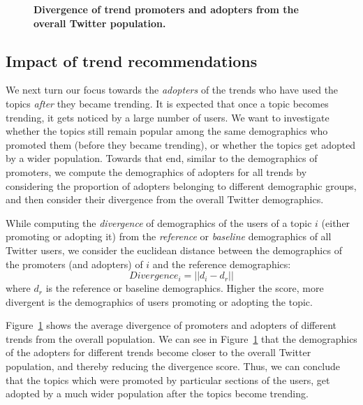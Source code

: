 \documentclass[letterpaper]{article}
\begin{document}
\begin{figure}[t]
\caption{{\bf Divergence of trend promoters and adopters from the overall Twitter population.}}
\label{fig:promoter_adopter_bias}
\vspace*{-5mm}
\end{figure}

\subsection{Impact of trend recommendations}
\noindent
We next turn our focus towards the {\it adopters} of the trends who have used the topics
{\it after} they became trending. It is expected that once a topic becomes trending,
it gets noticed by a large number of users.
We want to investigate whether the topics still remain popular among the same demographics who promoted them
(before they became trending),
or whether the topics get adopted by a wider population.
Towards that end, similar to the demographics of promoters, we compute the
demographics of adopters for all trends by considering the proportion of adopters belonging
to different demographic groups, and then consider their divergence from the overall Twitter demographics.

While computing the {\it divergence} of demographics of the users of a topic $i$ (either promoting or adopting it)
from the {\it reference} or {\it baseline} demographics of all Twitter users, we consider the euclidean distance between
the demographics of the promoters (and adopters) of $i$ and the reference demographics:
\begin{equation}
Divergence_{i} = || d_i - d_r ||
\end{equation}
where $d_r$ is the reference or baseline demographics.
Higher the score, more divergent is the demographics of users promoting or adopting the topic.

Figure~\ref{fig:promoter_adopter_bias} shows the average divergence of promoters and adopters of different trends from the overall population.
We can see in Figure~\ref{fig:promoter_adopter_bias} that the demographics of the adopters
 for different trends become closer to the overall Twitter population, and thereby reducing the divergence score. 
 Thus, we can conclude that the topics which were promoted by particular sections of the users, get adopted by a much wider population after the topics become trending.
\end{document}

